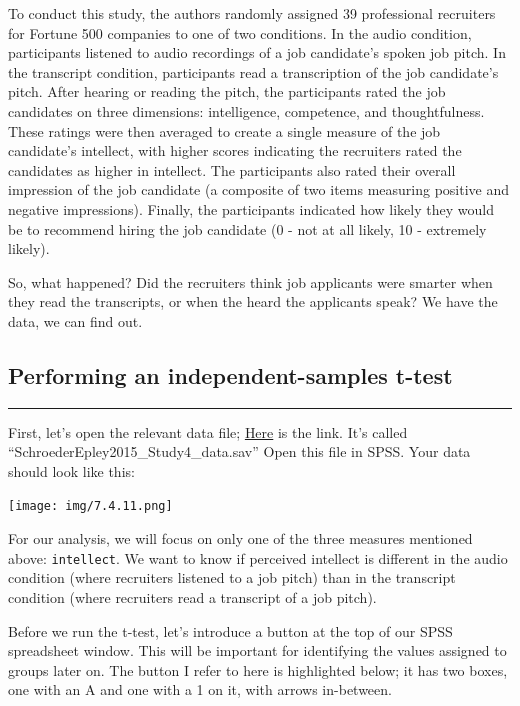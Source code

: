 \documentclass[]{book}
\begin{document}
To conduct this study, the authors randomly assigned 39 professional
recruiters for Fortune 500 companies to one of two conditions. In the
audio condition, participants listened to audio recordings of a job
candidate's spoken job pitch. In the transcript condition, participants
read a transcription of the job candidate's pitch. After hearing or
reading the pitch, the participants rated the job candidates on three
dimensions: intelligence, competence, and thoughtfulness. These ratings
were then averaged to create a single measure of the job candidate's
intellect, with higher scores indicating the recruiters rated the
candidates as higher in intellect. The participants also rated their
overall impression of the job candidate (a composite of two items
measuring positive and negative impressions). Finally, the participants
indicated how likely they would be to recommend hiring the job candidate
(0 - not at all likely, 10 - extremely likely).

So, what happened? Did the recruiters think job applicants were smarter
when they read the transcripts, or when the heard the applicants speak?
We have the data, we can find out.

\subsection{Performing an independent-samples
t-test}\label{performing-an-independent-samples-t-test}

\begin{center}\rule{0.5\linewidth}{0.5pt}\end{center}

First, let's open the relevant data file;
\href{https://github.com/CrumpLab/statisticsLab/blob/master/data/spssdata/SchroederEpley2015_Study4_data.sav}{Here}
is the link. It's called ``SchroederEpley2015\_Study4\_data.sav'' Open
this file in SPSS. Your data should look like this:

\texttt{[image: img/7.4.11.png]}

For our analysis, we will focus on only one of the three measures
mentioned above: \texttt{intellect}. We want to know if perceived
intellect is different in the audio condition (where recruiters listened
to a job pitch) than in the transcript condition (where recruiters read
a transcript of a job pitch).

Before we run the t-test, let's introduce a button at the top of our
SPSS spreadsheet window. This will be important for identifying the
values assigned to groups later on. The button I refer to here is
highlighted below; it has two boxes, one with an A and one with a 1 on
it, with arrows in-between.
\end{document}
